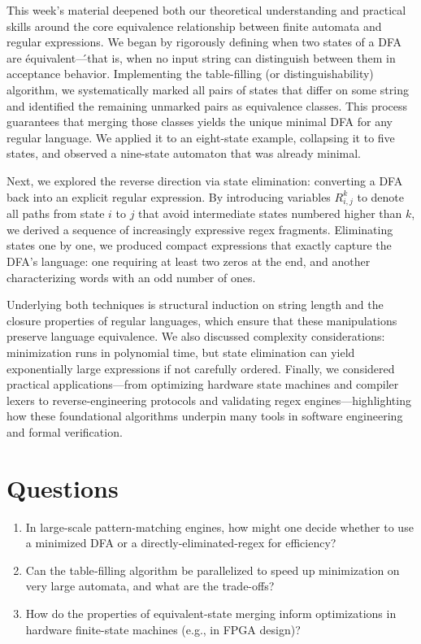 \documentclass{article}
\begin{document}
  This week’s material deepened both our theoretical understanding and practical skills around the core equivalence relationship between finite automata and regular expressions.  We began by rigorously defining when two states of a DFA are \'equivalent\'—that is, when no input string can distinguish between them in acceptance behavior.  Implementing the table-filling (or distinguishability) algorithm, we systematically marked all pairs of states that differ on some string and identified the remaining unmarked pairs as equivalence classes.  This process guarantees that merging those classes yields the unique minimal DFA for any regular language.  We applied it to an eight-state example, collapsing it to five states, and observed a nine-state automaton that was already minimal.  

    Next, we explored the reverse direction via state elimination: converting a DFA back into an explicit regular expression.  By introducing variables $R^k_{i,j}$ to denote all paths from state $i$ to $j$ that avoid intermediate states numbered higher than $k$, we derived a sequence of increasingly expressive regex fragments.  Eliminating states one by one, we produced compact expressions that exactly capture the DFA’s language: one requiring at least two zeros at the end, and another characterizing words with an odd number of ones.  

    Underlying both techniques is structural induction on string length and the closure properties of regular languages, which ensure that these manipulations preserve language equivalence.  We also discussed complexity considerations: minimization runs in polynomial time, but state elimination can yield exponentially large expressions if not carefully ordered.  Finally, we considered practical applications—from optimizing hardware state machines and compiler lexers to reverse-engineering protocols and validating regex engines—highlighting how these foundational algorithms underpin many tools in software engineering and formal verification.




\section*{Questions}
\begin{enumerate}
  \item In large-scale pattern-matching engines, how might one decide whether to
        use a minimized DFA or a directly-eliminated-regex for efficiency?  
  \item Can the table‑filling algorithm be parallelized to speed up minimization on
        very large automata, and what are the trade-offs?  
  \item How do the properties of equivalent-state merging inform optimizations in
        hardware finite-state machines (e.g., in FPGA design)?  
\end{enumerate}
\end{document}
